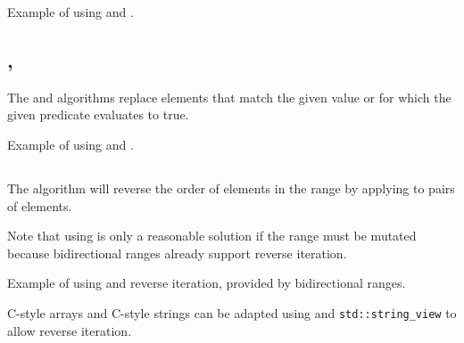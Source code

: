 \begin{box-note}
\footnotesize Example of using  and .
\tcblower
{}
\end{box-note}

\subsection{\texorpdfstring{, }{\texttt{std::replace}, \texttt{std::replace\_if}}}

The  and  algorithms replace elements that match the given value or for which the given predicate evaluates to true.


\begin{box-note}
\footnotesize Example of using  and .
\tcblower
{}
\end{box-note}

\subsection{\texorpdfstring{}{\texttt{std::reverse}}}

The  algorithm will reverse the order of elements in the range by applying  to pairs of elements.


Note that using  is only a reasonable solution if the range must be mutated because bidirectional ranges already support reverse iteration.

\begin{box-note}
\footnotesize Example of using  and reverse iteration, provided by bidirectional ranges.
\tcblower
{}
\end{box-note}

C-style arrays and C-style strings can be adapted using  and \texttt{std::string\-\_view} to allow reverse iteration.

